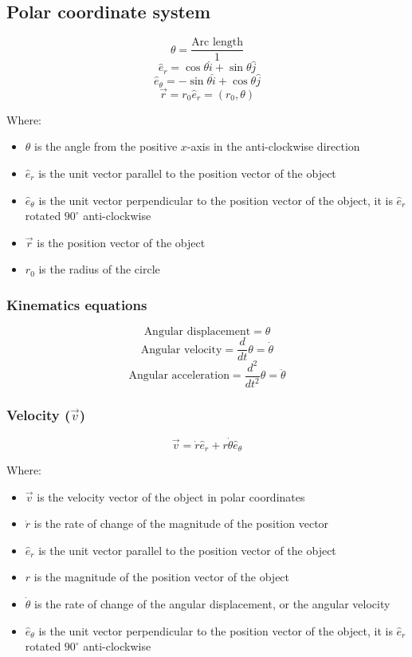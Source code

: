 \documentclass[11pt]{article}
\begin{document}
\subsection{Polar coordinate system}
\label{sec:org0856d55}
\[\theta = \frac{\text{Arc length}}{1}\]
\[\hat{e}_r = \cos \theta \hat{i} + \sin \theta \hat{j}\]
\[\hat{e}_{\theta} = - \sin \theta \hat{i} + \cos \theta \hat{j}\]
\[\vec{r} = r_0 \hat{e}_r = (r_0, \theta)\]

Where:
\begin{itemize}
\item \(\theta\) is the angle from the positive \(x\)-axis in the anti-clockwise direction
\item \(\hat{e}_r\) is the unit vector parallel to the position vector of the object
\item \(\hat{e}_{\theta}\) is the unit vector perpendicular to the position vector of the object, it is \(\hat{e}_r\) rotated \(90^{\circ}\) anti-clockwise
\item \(\vec{r}\) is the position vector of the object
\item \(r_0\) is the radius of the circle
\end{itemize}
\subsubsection{Kinematics equations}
\label{sec:orgc096d17}
\[\text{Angular displacement} = \theta\]
\[\text{Angular velocity} = \frac{d}{dt} \theta = \dot{\theta}\]
\[\text{Angular acceleration} = \frac{d^2}{dt^2} \theta = \ddot{\theta}\]
\subsubsection{Velocity (\(\vec{v}\))}
\label{sec:org4327183}
\[\vec{v} = \dot{r} \hat{e}_r + r \dot{\theta} \hat{e}_{\theta}\]

Where:
\begin{itemize}
\item \(\vec{v}\) is the velocity vector of the object in polar coordinates
\item \(\dot{r}\) is the rate of change of the magnitude of the position vector
\item \(\hat{e}_r\) is the unit vector parallel to the position vector of the object
\item \(r\) is the magnitude of the position vector of the object
\item \(\dot{\theta}\) is the rate of change of the angular displacement, or the angular velocity
\item \(\hat{e}_{\theta}\) is the unit vector perpendicular to the position vector of the object, it is \(\hat{e}_r\) rotated \(90^{\circ}\) anti-clockwise
\end{itemize}
\end{document}
